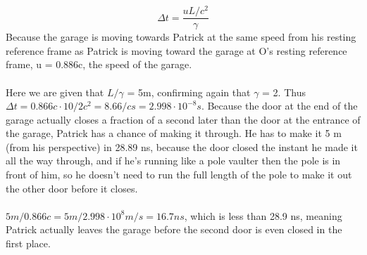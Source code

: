 \documentclass{article}
\begin{document}
$$ \Delta t = \frac{uL/c^2}{\gamma} $$
Because the garage is moving towards Patrick at the same speed from his resting reference frame as Patrick is moving toward the garage at O's resting reference frame, u = 0.886c, the speed of the garage. \\
\\
Here we are given that $L/\gamma$ = 5m, confirming again that $\gamma$ = 2. Thus $\Delta t = 0.866c \cdot 10/2c^2 = 8.66/c s = 2.998 \cdot 10^{-8} s $. Because the door at the end of the garage actually closes a fraction of a second later than the door at the entrance of the garage, Patrick has a chance of making it through. He has to make it 5 m (from his perspective) in 28.89 ns, because the door closed the instant he made it all the way through, and if he's running like a pole vaulter then the pole is in front of him, so he doesn't need to run the full length of the pole to make it out the other door before it closes. \\
\\
$ 5 m / 0.866c = 5 m / 2.998 \cdot 10^8 m/s = 16.7 ns$, which is less than 28.9 ns, meaning Patrick actually leaves the garage before the second door is even closed in the first place.
\end{document}
